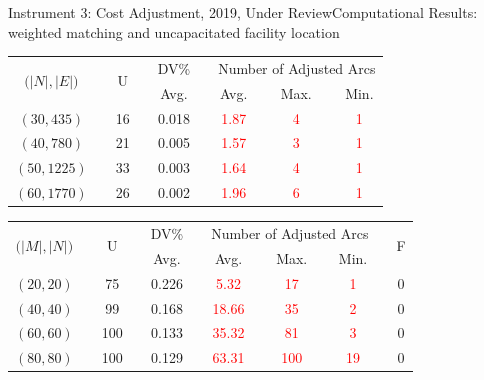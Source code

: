 \documentclass[14pt]{beamer}
\begin{document}
\begin{frame}{Instrument 3: Cost Adjustment, {\footnotesize 2019, Under Review}}{Computational Results: weighted matching and uncapacitated facility location}
\footnotesize
\begin{table}[t]
	\centering
	\tabcolsep=6pt
	\renewcommand\arraystretch{1.3}
	\begin{tabular}[!h]{c c c c c c c c c c c}
		\hline
		\multirow{2}{*}{$\big(|N|,|E|\big)$} &\multicolumn{1}{c}{} &\multirow{2}{*}{U} &\multicolumn{1}{c}{} &\multicolumn{1}{c}{DV\%} &\multicolumn{1}{c}{}	 &\multicolumn{5}{c}{Number of Adjusted Arcs}\\
		\cline{5-5}
		\cline{7-11}
		&&&	&Avg.	&&Avg.	&&Max.	&&Min.\\
		\hline
		$(30,435)$	&&16 	&&0.018				&&\textcolor{red}{1.87}		&&\textcolor{red}{4}		&&\textcolor{red}{1}\\
		$(40,780)$	&&21	&&0.005				&&\textcolor{red}{1.57}		&&\textcolor{red}{3}		&&\textcolor{red}{1}\\
		$(50,1225)$	&&33	&&0.003				&&\textcolor{red}{1.64} 	&&\textcolor{red}{4}		&&\textcolor{red}{1}\\
		$(60,1770)$ &&26	&&0.002				&&\textcolor{red}{1.96}		&&\textcolor{red}{6}		&&\textcolor{red}{1}\\
		\hline
	\end{tabular}
\end{table}
\begin{table}[t]
	\centering
	\tabcolsep=6pt
	\renewcommand\arraystretch{1.3}
	\begin{tabular}[!h]{c c c c c c c c c c c c c}
		\hline
		\multirow{2}{*}{$\big(|M|,|N|\big)$} &\multicolumn{1}{c}{} &\multirow{2}{*}{U} &\multicolumn{1}{c}{} &\multicolumn{1}{c}{DV\%} &\multicolumn{1}{c}{}	&\multicolumn{5}{c}{Number of Adjusted Arcs} &\multicolumn{1}{c}{} &\multirow{2}{*}{F} \\
		\cline{5-5}
		\cline{7-11}
		&&&	&Avg.	&&Avg.	&&Max.	&&Min.\\
		\hline
$(20,20)$	&&75		&&0.226		&&\textcolor{red}{5.32}		&&\textcolor{red}{17}	&&\textcolor{red}{1}		&&0\\
$(40,40)$	&&99		&&0.168		&&\textcolor{red}{18.66}		&&\textcolor{red}{35}  	&&\textcolor{red}{2}		&&0\\
$(60,60)$	&&100		&&0.133		&&\textcolor{red}{35.32}	&&\textcolor{red}{81} 	&&\textcolor{red}{3}		&&0\\
$(80,80)$	&&100		&&0.129		&&\textcolor{red}{63.31}	&&\textcolor{red}{100} 	&&\textcolor{red}{19}		&&0\\
		\hline
	\end{tabular}
\end{table}
\end{frame}
\end{document}
